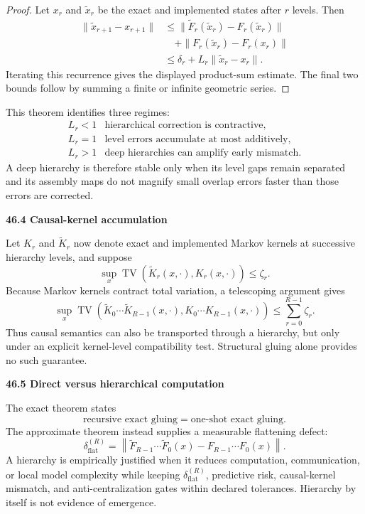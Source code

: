 \documentclass[11pt,letterpaper]{article}
\newcommand{\subtopic}[1]{%
 \vspace{0.45em}
 {\bfseries\color{AccentColor} #1\par}
}
\theoremstyle{plain}
\theoremstyle{definition}
\begin{document}
\begin{proof}
Let \(x_r\) and \(\widetilde x_r\) be the exact and implemented states after
\(r\) levels. Then
\[
\begin{aligned}
\|\widetilde x_{r+1}-x_{r+1}\|
&\leq
\|\widetilde F_r(\widetilde x_r)-F_r(\widetilde x_r)\|\\
&\quad+
\|F_r(\widetilde x_r)-F_r(x_r)\|\\
&\leq
\delta_r+L_r\|\widetilde x_r-x_r\|.
\end{aligned}
\]
Iterating this recurrence gives the displayed product-sum estimate. The final
two bounds follow by summing a finite or infinite geometric series.
\end{proof}

This theorem identifies three regimes:
\[
\begin{array}{ll}
L_r<1
&\text{hierarchical correction is contractive},\\
L_r=1
&\text{level errors accumulate at most additively},\\
L_r>1
&\text{deep hierarchies can amplify early mismatch}.
\end{array}
\]
A deep hierarchy is therefore stable only when its level gaps remain separated
and its assembly maps do not magnify small overlap errors faster than those
errors are corrected.

\subtopic{46.4 Causal-kernel accumulation}

Let \(K_r\) and \(\widetilde K_r\) now denote exact and implemented Markov
kernels at successive hierarchy levels, and suppose
\[
\sup_x
\operatorname{TV}
\left(
\widetilde K_r(x,\cdot),
K_r(x,\cdot)
\right)
\leq
\zeta_r.
\]
Because Markov kernels contract total variation, a telescoping argument gives
\[
\boxed{
\sup_x
\operatorname{TV}
\left(
\widetilde K_0\cdots\widetilde K_{R-1}(x,\cdot),
K_0\cdots K_{R-1}(x,\cdot)
\right)
\leq
\sum_{r=0}^{R-1}\zeta_r.
}
\]
Thus causal semantics can also be transported through a hierarchy, but only
under an explicit kernel-level compatibility test. Structural gluing alone
provides no such guarantee.

\subtopic{46.5 Direct versus hierarchical computation}

The exact theorem states
\[
\boxed{
\text{recursive exact gluing}
=
\text{one-shot exact gluing}.
}
\]
The approximate theorem instead supplies a measurable flattening defect:
\[
\boxed{
\delta_{\mathrm{flat}}^{(R)}
=
\left\|
\widetilde F_{R-1}\cdots\widetilde F_0(x)
-
F_{R-1}\cdots F_0(x)
\right\|.
}
\]
A hierarchy is empirically justified when it reduces computation,
communication, or local model complexity while keeping
\(\delta_{\mathrm{flat}}^{(R)}\), predictive risk, causal-kernel mismatch, and
anti-centralization gates within declared tolerances. Hierarchy by itself is
not evidence of emergence.
\end{document}
